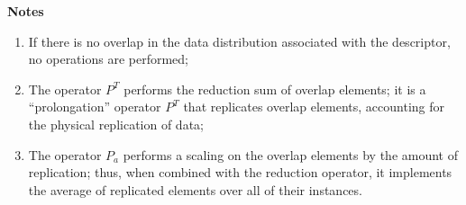 {\par\noindent\large\bfseries Notes}
\begin{enumerate}
\item If there is no overlap in the data distribution associated with
  the descriptor, no operations are performed;
\item The operator $P^{T}$ performs the reduction sum of overlap
elements; it is a ``prolongation'' operator $P^T$ that
replicates overlap elements, accounting for the physical replication
of data;
\item The operator $P_a$ performs a scaling on the overlap elements by
the amount of replication; thus, when combined with the reduction
operator, it implements the average of replicated elements over all of
their instances. 
\end{enumerate}
 
